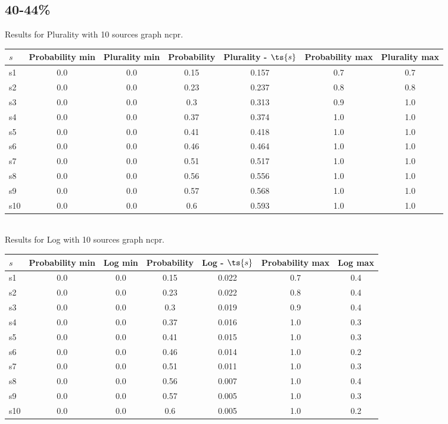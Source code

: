 \documentclass{article}
\begin{document}
\newpage

\subsection{40-44\%}

\noindent Results for Plurality with 10 sources graph ncpr.

\noindent\begin{tabular}{|l|c|c|c|c|c|c|}
\hline
$s$& Probability min & Plurality min & Probability & Plurality - $\ts{s}$ & Probability max & Plurality max\\
\hline
s1 &0.0 & 0.0 & 0.15 & 0.157 & 0.7 & 0.7\\
\hline
s2 &0.0 & 0.0 & 0.23 & 0.237 & 0.8 & 0.8\\
\hline
s3 &0.0 & 0.0 & 0.3 & 0.313 & 0.9 & 1.0\\
\hline
s4 &0.0 & 0.0 & 0.37 & 0.374 & 1.0 & 1.0\\
\hline
s5 &0.0 & 0.0 & 0.41 & 0.418 & 1.0 & 1.0\\
\hline
s6 &0.0 & 0.0 & 0.46 & 0.464 & 1.0 & 1.0\\
\hline
s7 &0.0 & 0.0 & 0.51 & 0.517 & 1.0 & 1.0\\
\hline
s8 &0.0 & 0.0 & 0.56 & 0.556 & 1.0 & 1.0\\
\hline
s9 &0.0 & 0.0 & 0.57 & 0.568 & 1.0 & 1.0\\
\hline
s10 &0.0 & 0.0 & 0.6 & 0.593 & 1.0 & 1.0\\
\hline
\end{tabular}\\

\noindent Results for Log with 10 sources graph ncpr.

\noindent\begin{tabular}{|l|c|c|c|c|c|c|}
\hline
$s$& Probability min & Log min & Probability & Log - $\ts{s}$ & Probability max & Log max\\
\hline
s1 &0.0 & 0.0 & 0.15 & 0.022 & 0.7 & 0.4\\
\hline
s2 &0.0 & 0.0 & 0.23 & 0.022 & 0.8 & 0.4\\
\hline
s3 &0.0 & 0.0 & 0.3 & 0.019 & 0.9 & 0.4\\
\hline
s4 &0.0 & 0.0 & 0.37 & 0.016 & 1.0 & 0.3\\
\hline
s5 &0.0 & 0.0 & 0.41 & 0.015 & 1.0 & 0.3\\
\hline
s6 &0.0 & 0.0 & 0.46 & 0.014 & 1.0 & 0.2\\
\hline
s7 &0.0 & 0.0 & 0.51 & 0.011 & 1.0 & 0.3\\
\hline
s8 &0.0 & 0.0 & 0.56 & 0.007 & 1.0 & 0.4\\
\hline
s9 &0.0 & 0.0 & 0.57 & 0.005 & 1.0 & 0.3\\
\hline
s10 &0.0 & 0.0 & 0.6 & 0.005 & 1.0 & 0.2\\
\hline
\end{tabular}\\
\end{document}
